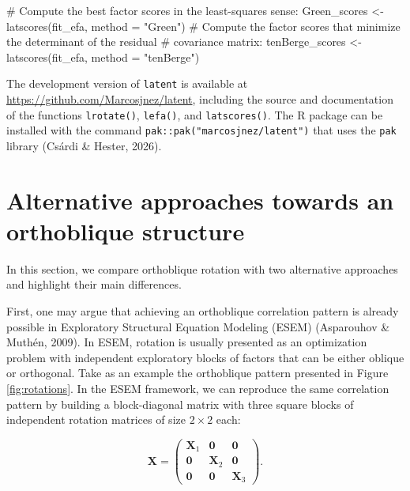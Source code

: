\documentclass[
  12pt,
  letterpaper,
  article]{scrartcl}
\newenvironment{Shaded}{\begin{snugshade}}{\end{snugshade}}
\newcommand{\AttributeTok}[1]{\textcolor[rgb]{0.40,0.45,0.13}{#1}}
\newcommand{\CommentTok}[1]{\textcolor[rgb]{0.37,0.37,0.37}{#1}}
\newcommand{\FunctionTok}[1]{\textcolor[rgb]{0.28,0.35,0.67}{#1}}
\newcommand{\NormalTok}[1]{\textcolor[rgb]{0.00,0.23,0.31}{#1}}
\newcommand{\OtherTok}[1]{\textcolor[rgb]{0.00,0.23,0.31}{#1}}
\newcommand{\StringTok}[1]{\textcolor[rgb]{0.13,0.47,0.30}{#1}}
\begin{document}
\begin{Shaded}
\begin{Highlighting}[]
\CommentTok{\# Compute the best factor scores in the least{-}squares sense:}
\NormalTok{Green\_scores }\OtherTok{\textless{}{-}} \FunctionTok{latscores}\NormalTok{(fit\_efa, }\AttributeTok{method =} \StringTok{"Green"}\NormalTok{)}
\CommentTok{\# Compute the factor scores that minimize the determinant of the residual}
\CommentTok{\# covariance matrix:}
\NormalTok{tenBerge\_scores }\OtherTok{\textless{}{-}} \FunctionTok{latscores}\NormalTok{(fit\_efa, }\AttributeTok{method =} \StringTok{"tenBerge"}\NormalTok{)}
\end{Highlighting}
\end{Shaded}

The development version of \texttt{latent} is available at
\url{https://github.com/Marcosjnez/latent}, including the source and
documentation of the functions \texttt{lrotate()}, \texttt{lefa()}, and
\texttt{latscores()}. The R package can be installed with the command
\texttt{pak::pak("marcosjnez/latent")} that uses the \texttt{pak}
library (Csárdi \& Hester, 2026).

\section{Alternative approaches towards an orthoblique
structure}\label{alternative-approaches-towards-an-orthoblique-structure}

In this section, we compare orthoblique rotation with two alternative
approaches and highlight their main differences.

First, one may argue that achieving an orthoblique correlation pattern
is already possible in Exploratory Structural Equation Modeling (ESEM)
(Asparouhov \& Muthén, 2009). In ESEM, rotation is usually presented as
an optimization problem with independent exploratory blocks of factors
that can be either oblique or orthogonal. Take as an example the
orthoblique pattern presented in Figure \ref{fig:rotations}. In the ESEM
framework, we can reproduce the same correlation pattern by building a
block-diagonal matrix with three square blocks of independent rotation
matrices of size \(2\times 2\) each:

\[
\mathbf{X} =
\begin{pmatrix}
\mathbf{X}_1 & \mathbf{0} & \mathbf{0}\\
\mathbf{0} & \mathbf{X}_2 & \mathbf{0}\\
\mathbf{0} & \mathbf{0} & \mathbf{X}_3
\end{pmatrix}.
\]
\end{document}
